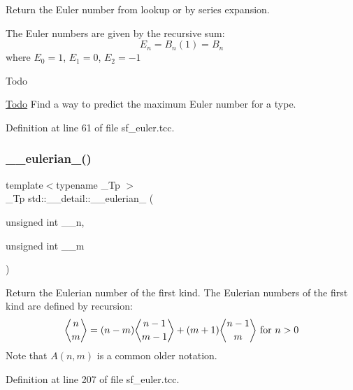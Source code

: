 Return the Euler number from lookup or by series expansion.

The Euler numbers are given by the recursive sum\+: \[ E_n = B_n(1) = B_n \] where $ E_0 = 1 $, $ E_1 = 0 $, $ E_2 = -1 $

\begin{DoxyRefDesc}{Todo}
\item[\hyperlink{todo__todo000004}{Todo}]Find a way to predict the maximum Euler number for a type. \end{DoxyRefDesc}


Definition at line 61 of file sf\+\_\+euler.\+tcc.

\mbox{\label{namespacestd_1_1____detail_a4556229d8792527574bfc6fa135908dd}} 
\subsubsection{\texorpdfstring{\+\_\+\+\_\+eulerian\+\_()}{\_\_eulerian\_1()}\hspace{0.1cm}{\footnotesize\ttfamily [1/2]}}
{\footnotesize\ttfamily template$<$typename \+\_\+\+Tp $>$ \\
\+\_\+\+Tp std\+::\+\_\+\+\_\+detail\+::\+\_\+\+\_\+eulerian\+\_ (\begin{DoxyParamCaption}\item[{unsigned int}]{\+\_\+\+\_\+n,  }\item[{unsigned int}]{\+\_\+\+\_\+m }\end{DoxyParamCaption})\hspace{0.3cm}{\ttfamily [inline]}}

Return the Eulerian number of the first kind. The Eulerian numbers of the first kind are defined by recursion\+: \[ \genfrac{\langle}{\rangle}{0pt}{0}{n}{m} = (n-m)\genfrac{\langle}{\rangle}{0pt}{0}{n-1}{m-1} + (m+1)\genfrac{\langle}{\rangle}{0pt}{0}{n-1}{m} \mbox{ for } n > 0 \] Note that $ A(n,m) $ is a common older notation. 

Definition at line 207 of file sf\+\_\+euler.\+tcc.

\mbox{\label{namespacestd_1_1____detail_ad0759105350d0c440c1b5e8957223438}} 
